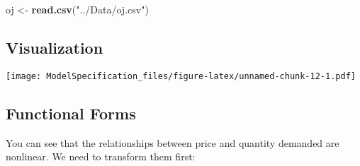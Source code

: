\documentclass[
]{article}
\newenvironment{Shaded}{\begin{snugshade}}{\end{snugshade}}
\newcommand{\AttributeTok}[1]{\textcolor[rgb]{0.13,0.29,0.53}{#1}}
\newcommand{\FunctionTok}[1]{\textcolor[rgb]{0.13,0.29,0.53}{\textbf{#1}}}
\newcommand{\NormalTok}[1]{#1}
\newcommand{\OtherTok}[1]{\textcolor[rgb]{0.56,0.35,0.01}{#1}}
\newcommand{\SpecialCharTok}[1]{\textcolor[rgb]{0.81,0.36,0.00}{\textbf{#1}}}
\newcommand{\StringTok}[1]{\textcolor[rgb]{0.31,0.60,0.02}{#1}}
\begin{document}
\begin{Shaded}
\begin{Highlighting}[]
\NormalTok{oj }\OtherTok{\textless{}{-}} \FunctionTok{read.csv}\NormalTok{(}\StringTok{"../Data/oj.csv"}\NormalTok{) }
\end{Highlighting}
\end{Shaded}

\subsection{Visualization}\label{visualization}

\begin{Shaded}
\end{Shaded}

\texttt{[image: ModelSpecification\_files/figure-latex/unnamed-chunk-12-1.pdf]}

\subsection{Functional Forms}\label{functional-forms}

You can see that the relationships between price and quantity demanded
are nonlinear. We need to transform them first:

\begin{Shaded}
\end{Shaded}
\end{document}

